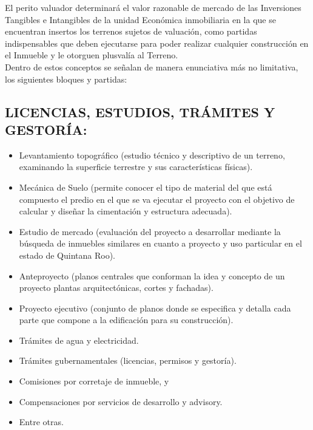 El perito valuador determinar\'a el valor razonable de mercado de las \textcolor{principal}{Inversiones Tangibles e Intangibles} de la unidad Econ\'omica inmobiliaria en la que se encuentran insertos los terrenos sujetos de valuaci\'on, como partidas indispensables que deben ejecutarse para poder realizar cualquier construcci\'on en el Inmueble y le otorguen plusval\'ia al Terreno.\\ 

Dentro de estos conceptos se se\~nalan de manera enunciativa m\'as no limitativa, los siguientes bloques y partidas:

\subsection{LICENCIAS, ESTUDIOS, TR\'AMITES Y GESTOR\'IA:} 
\begin{itemize}
\item Levantamiento topogr\'afico (estudio t\'ecnico y descriptivo de un terreno, examinando la superficie terrestre y sus caracter\'isticas f\'isicas).

\item Mec\'anica de Suelo (permite conocer el tipo de material del que est\'a compuesto el predio en el que se va ejecutar el proyecto con el objetivo de calcular y dise\~nar la cimentaci\'on y estructura adecuada).

\item Estudio de mercado (evaluaci\'on del proyecto a desarrollar mediante la b\'usqueda de inmuebles similares en cuanto a proyecto y uso particular en el estado de Quintana Roo).

\item Anteproyecto (planos centrales que conforman la idea y concepto de un proyecto plantas arquitect\'onicas, cortes y fachadas).

\item Proyecto ejecutivo (conjunto de planos donde se especifica y detalla cada parte que compone a la edificaci\'on para su construcci\'on).

\item Tr\'amites de agua y electricidad.

\item Tr\'amites gubernamentales (licencias, permisos y gestor\'ia).

\item Comisiones por corretaje de inmueble, y 

\item Compensaciones por servicios de desarrollo y advisory.

\item Entre otras.

\end{itemize}